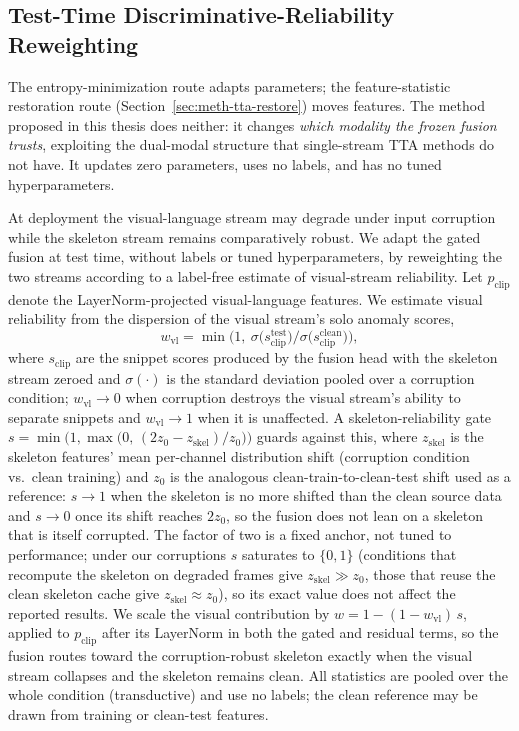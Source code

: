 \subsection{Test-Time Discriminative-Reliability Reweighting}
\label{sec:disc}

The entropy-minimization route adapts parameters; the feature-statistic restoration route
(Section~\ref{sec:meth-tta-restore}) moves features. The method proposed in this thesis does
neither: it changes \emph{which modality
the frozen fusion trusts}, exploiting the dual-modal structure that single-stream TTA methods do
not have. It updates zero parameters, uses no labels, and has no tuned hyperparameters.

At deployment the visual-language stream may degrade under input corruption while the skeleton stream remains comparatively robust. We adapt the gated fusion at test time, without labels or tuned hyperparameters, by reweighting the two streams according to a label-free estimate of visual-stream reliability. Let $p_{\mathrm{clip}}$ denote the LayerNorm-projected visual-language features. We estimate visual reliability from the dispersion of the visual stream's solo anomaly scores,
\begin{equation}
w_{\mathrm{vl}} = \min\!\Big(1,\ \sigma\big(s_{\mathrm{clip}}^{\mathrm{test}}\big) \big/ \sigma\big(s_{\mathrm{clip}}^{\mathrm{clean}}\big)\Big),
\end{equation}
where $s_{\mathrm{clip}}$ are the snippet scores produced by the fusion head with the skeleton stream zeroed and $\sigma(\cdot)$ is the standard deviation pooled over a corruption condition; $w_{\mathrm{vl}}\!\to\!0$ when corruption destroys the visual stream's ability to separate snippets and $w_{\mathrm{vl}}\!\to\!1$ when it is unaffected. A skeleton-reliability gate $s = \min\!\big(1, \max\big(0,\, (2 z_0 - z_{\mathrm{skel}})/z_0\big)\big)$ guards against this, where $z_{\mathrm{skel}}$ is the skeleton features' mean per-channel distribution shift (corruption condition vs.\ clean training) and $z_0$ is the analogous clean-train-to-clean-test shift used as a reference: $s\!\to\!1$ when the skeleton is no more shifted than the clean source data and $s\!\to\!0$ once its shift reaches $2 z_0$, so the fusion does not lean on a skeleton that is itself corrupted. The factor of two is a fixed anchor, not tuned to performance; under our corruptions $s$ saturates to $\{0,1\}$ (conditions that recompute the skeleton on degraded frames give $z_{\mathrm{skel}}\!\gg\!z_0$, those that reuse the clean skeleton cache give $z_{\mathrm{skel}}\!\approx\!z_0$), so its exact value does not affect the reported results. We scale the visual contribution by $w = 1-(1-w_{\mathrm{vl}})\,s$, applied to $p_{\mathrm{clip}}$ after its LayerNorm in both the gated and residual terms, so the fusion routes toward the corruption-robust skeleton exactly when the visual stream collapses and the skeleton remains clean. All statistics are pooled over the whole condition (transductive) and use no labels; the clean reference may be drawn from training or clean-test features.

